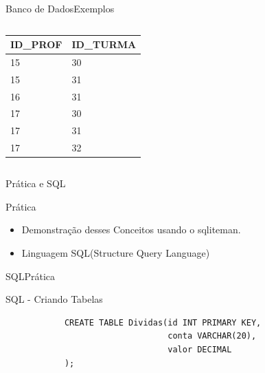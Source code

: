\documentclass{beamer}
\begin{document}
\begin{frame}[fragile]{Banco de Dados}{Exemplos}
\begin{columns}
		\begin{column}{0.5\textwidth}
			\begin{center}
					\begin{tabular}{ l | l }
						\hline
						\hline
						\hline					
						\rowcolor{header-color} \color{white}\textbf{ID\_PROF} & \color{white}\textbf{ID\_TURMA} \\
						\hline
						15 & 30\\
						\hline
						15 & 31\\
						\hline
						16 & 31\\
						\hline
						17 & 30\\
						\hline
						17 & 31\\
						\hline
						17 & 32\\						
						\hline
						\hline
					\end{tabular}%
			\end{center}		
		\end{column}
	\end{columns}		
\end{frame}














\begin{frame}{Prática e SQL}
	\begin{block} {\LARGE Prática}
		\begin{itemize} \itemsep 2em
			\item{\LARGE Demonstração desses Conceitos usando o sqliteman.}
			\item{\LARGE Linguagem SQL(Structure Query Language)}
		\end{itemize}
	\end{block}
\end{frame}

\begin{frame}[fragile]{SQL}{Prática}
	\begin{block} {SQL - Criando Tabelas}
		\begin{verbatim}
		    CREATE TABLE Dividas(id INT PRIMARY KEY,
		                         conta VARCHAR(20),
		                         valor DECIMAL
		    );
		\end{verbatim}
	\end{block}
\end{frame}
\end{document}

